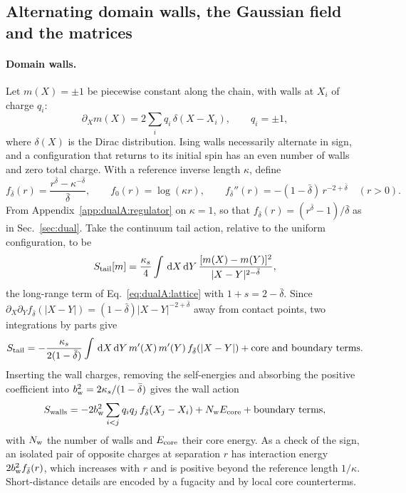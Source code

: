 \documentclass[11pt,a4paper]{article}
\numberwithin{equation}{section}
\newcommand{\dd}{\,\mathrm d}
\newcommand{\db}{\bar\delta}
\begin{document}
\subsection{Alternating domain walls, the Gaussian field and the matrices}\label{app:dualA:gas}
\paragraph{Domain walls.} Let $m(X)=\pm1$ be piecewise constant along the chain, with walls at $X_i$ of charge
$q_i$:
\begin{equation}
 \partial_Xm(X)=2\sum_iq_i\,\delta(X-X_i),\qquad q_i=\pm1,
\end{equation}
where $\delta(X)$ is the Dirac distribution. Ising walls necessarily alternate in sign, and a configuration that
returns to its initial spin has an even number of walls and zero total charge. With a reference inverse length
$\kappa$, define
\begin{equation}
 f_{\db}(r)=\frac{r^{\db}-\kappa^{-\db}}{\db},\qquad f_0(r)=\log(\kappa r),\qquad
 f_{\db}''(r)=-(1-\db)\,r^{-2+\db}\quad(r>0).
 \label{eq:dualA:fdb}
\end{equation}
From Appendix~\ref{app:dualA:regulator} on $\kappa=1$, so that $f_{\db}(r)=(r^{\db}-1)/\db$ as in
Sec.~\ref{sec:dual}. Take the continuum tail action, relative to the uniform configuration, to be
\begin{equation}
 S_{\rm tail}[m]=\frac{\kappa_s}{4}\int\dd X\dd Y\,\frac{[m(X)-m(Y)]^2}{|X-Y|^{2-\db}},
\end{equation}
the long-range term of Eq.~\eqref{eq:dualA:lattice} with $1+s=2-\db$. Since
$\partial_X\partial_Yf_{\db}(|X-Y|)=(1-\db)|X-Y|^{-2+\db}$ away from contact points, two integrations by parts give
\begin{equation}
 S_{\rm tail}=-\frac{\kappa_s}{2(1-\db)}\int\dd X\dd Y\,m'(X)\,m'(Y)\,f_{\db}(|X-Y|)+\text{core and boundary terms}.
\end{equation}
Inserting the wall charges, removing the self-energies and absorbing the positive coefficient into
$b_{\rm w}^2=2\kappa_s/(1-\db)$ gives the wall action
\begin{equation}
 S_{\rm walls}=-2b_{\rm w}^2\sum_{i<j}q_iq_j\,f_{\db}(X_j-X_i)+N_{\rm w}E_{\rm core}+\text{boundary terms},
 \label{eq:dualA:wallaction}
\end{equation}
with $N_{\rm w}$ the number of walls and $E_{\rm core}$ their core energy. As a check of the sign, an isolated pair
of opposite charges at separation $r$ has interaction energy $2b_{\rm w}^2f_{\db}(r)$, which increases with $r$ and is
positive beyond the reference length $1/\kappa$. Short-distance details are encoded by a fugacity and by local core
counterterms.
\end{document}
